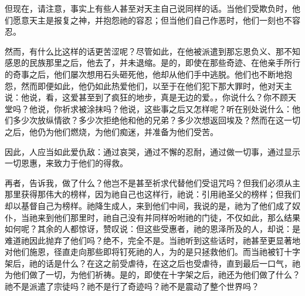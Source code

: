 但现在，请注意，事实上有些人甚至对天主自己说同样的话。当他们受欺负时，他们愿意天主是报复之神，并抱怨祂的容忍；但当他们自己作恶时，他们一刻也不容忍。\par

然而，有什么比这样的话更苦涩呢？尽管如此，在他被派遣到那忘恩负义、那不知感恩的民族那里之后，他去了，并未退缩。是的，即使在那些奇迹、在他亲手所行的奇事之后，他们屡次想用石头砸死他，他却从他们手中逃脱。他们也不断地抱怨，然而即便如此，他仍如此热爱他们，以至于在他们犯下那大罪时，他对天主说：他说，看，这爱甚至到了疯狂的地步，真是无边的爱。，你说什么？你不顾天堂吗？他说，你祈求被涂抹吗？他说，这些事之后又怎样呢？听在别处说什么：他们多少次放纵情欲？多少次拒绝他和他的兄弟？多少次想返回埃及？然而在这一切之后，他仍为他们燃烧，为他们痴迷，并准备为他们受苦。\par

因此，人应当如此爱仇敌：通过哀哭，通过不懈的忍耐，通过做一切事，通过显示一切恩惠，来致力于他们的得救。\par

再者，告诉我，做了什么？他岂不是甚至祈求代替他们受诅咒吗？但我们必须从主那里获得那伟大的榜样，因为祂自己也这样行，祂说：引用祂圣父的榜样；但我们却以基督自己为榜样。祂降生成人，来到他们中间，我说的是，祂为了他们成了奴仆，当祂来到他们那里时，祂自己没有并同样吩咐祂的门徒，不仅如此，那么结果如何呢？其余的人都惊讶，赞叹说：但这些受惠者，祂的恩泽所及的人，却说：是难道祂因此抛弃了他们吗？绝不，完全不是。当祂听到这些话时，祂甚至更显著地对他们施恩，径直走向那些即将钉死祂的人，为的是只拯救他们。而当祂被钉十字架后，祂的话是什么？在这之前受虐待，在这之后也受虐待，直到最后一口气，祂为他们做了一切，为他们祈祷。是的，即使在十字架之后，祂还为他们做了什么？祂不是派遣了宗徒吗？祂不是行了奇迹吗？祂不是震动了整个世界吗？\par

